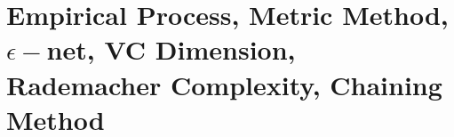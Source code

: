 \newpage
\section{Empirical Process, Metric Method, $\epsilon-$net, VC Dimension, Rademacher Complexity, Chaining Method}